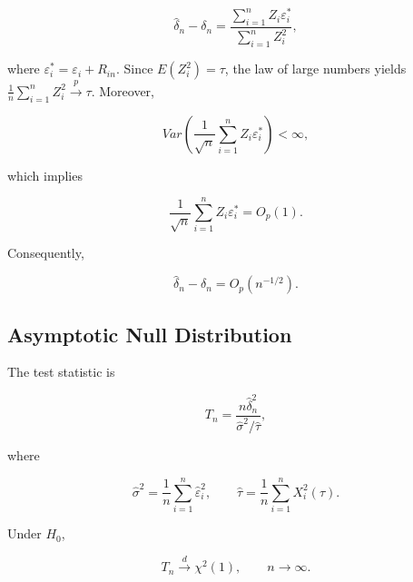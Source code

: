 \documentclass[twoside]{article}
\begin{document}
\begin{equation}\label{eq9}
	\widehat{\delta}_n-\delta_n
	=
	\frac{
		\sum_{i=1}^{n}Z_i\varepsilon_i^*
	}{
		\sum_{i=1}^{n}Z_i^2
	},
\end{equation}

where
$
\varepsilon_i^*=\varepsilon_i+R_{in}.
$
Since $E(Z_i^2)=\tau$, the law of large numbers yields
$
\frac1n\sum_{i=1}^{n}Z_i^2
\xrightarrow{p}
\tau.
$
Moreover,

\[
Var\left(
\frac1{\sqrt n}
\sum_{i=1}^{n}Z_i\varepsilon_i^*
\right)
<\infty,
\]

which implies

\[
\frac1{\sqrt n}
\sum_{i=1}^{n}Z_i\varepsilon_i^*
=
O_p(1).
\]

Consequently,

\begin{equation}\label{eq10}
	\widehat{\delta}_n-\delta_n
	=
	O_p(n^{-1/2}).
\end{equation}


\subsection{Asymptotic Null Distribution}

The test statistic is

\begin{equation}\label{eq11}
	T_n
	=
	\frac{
		n\widehat{\delta}_n^2
	}{
		\widehat{\sigma}^2/\widehat{\tau}
	},
\end{equation}

where

\[
\widehat{\sigma}^2
=
\frac1n
\sum_{i=1}^{n}\widehat{\varepsilon}_i^2,
\qquad
\widehat{\tau}
=
\frac1n
\sum_{i=1}^{n}X_i^2(\tau).
\]


\begin{thm}\label{th1}
	Under $H_0$,
	
	\[
	T_n
	\xrightarrow{d}
	\chi^2(1),
	\qquad
	n\to\infty.
	\]
\end{thm}
\end{document}
